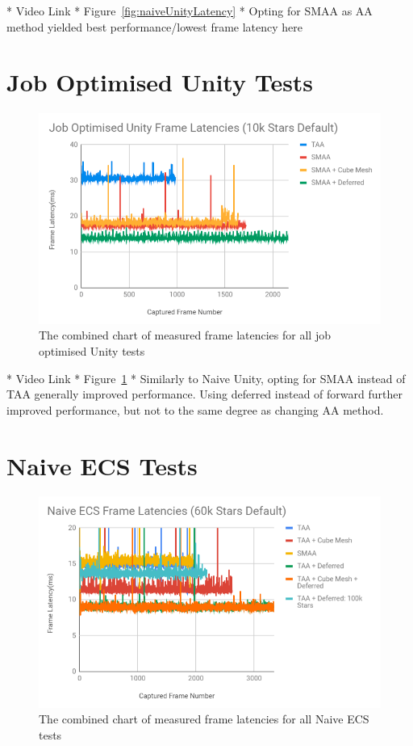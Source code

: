 * Video Link
* Figure~\ref{fig:naiveUnityLatency}
* Opting for SMAA as AA method yielded best performance/lowest frame latency here

\section{Job Optimised Unity Tests}
\begin{figure}[!p]
    \centering
    \includegraphics[width=1\textwidth]{Figures/jobOptimisedUnityLatencies.png}
    \caption[Combined Frame Latency Chart for Job Optimised Unity Tests]{The combined chart of measured frame latencies for all job optimised Unity tests}
    \label{fig:jobOptimisedUnityLatency}
\end{figure}

* Video Link
* Figure~\ref{fig:jobOptimisedUnityLatency}
* Similarly to Naive Unity, opting for SMAA instead of TAA generally improved performance. Using deferred instead of forward further improved performance, but not to the same degree as changing AA method.

\section{Naive ECS Tests}
\begin{figure}[!p]
    \centering
    \includegraphics[width=1\textwidth]{Figures/naiveEcsLatencies.png}
    \caption[Combined Frame Latency Chart for Unity Tests]{The combined chart of measured frame latencies for all Naive ECS tests}
    \label{fig:naiveEcsUnityLatency}
\end{figure}

